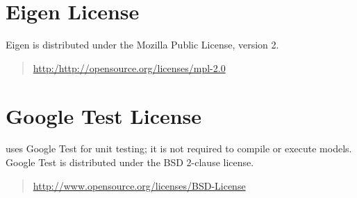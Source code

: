 \section{Eigen License} 
%
Eigen is distributed under the Mozilla Public License,
version 2.
%
\begin{quote}
\url{http:/http://opensource.org/licenses/mpl-2.0}
\end{quote}

\section{Google Test License}

\CmdStan uses Google Test for unit testing; it is not required to
compile or execute models.  Google Test is distributed under the BSD
2-clause license.
%
\begin{quote}
\url{http://www.opensource.org/licenses/BSD-License}
\end{quote}

